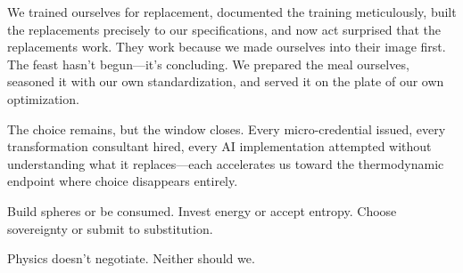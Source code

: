 We trained ourselves for replacement, documented the training meticulously, built the replacements precisely to our specifications, and now act surprised that the replacements work. They work because we made ourselves into their image first. The feast hasn't begun---it's concluding. We prepared the meal ourselves, seasoned it with our own standardization, and served it on the plate of our own optimization.

The choice remains, but the window closes. Every micro-credential issued, every transformation consultant hired, every AI implementation attempted without understanding what it replaces---each accelerates us toward the thermodynamic endpoint where choice disappears entirely.

Build spheres or be consumed. Invest energy or accept entropy. Choose sovereignty or submit to substitution.

Physics doesn't negotiate. Neither should we.
